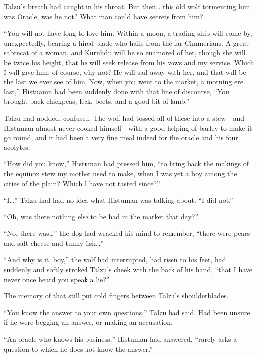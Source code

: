 Talzu's breath had caught in his throat. But then\ldots{} this old wolf tormenting him was Oracle, was he not? What man could have secrets from him?

``You will not have long to love him. Within a moon, a trading ship will come by, unexpectedly, bearing a hired blade who hails from the far Cimmerians. A great sabrecat of a woman, and Kuruhdu will be so enamored of her, though she will be twice his height, that he will seek release from his vows and my service. Which I will give him, of course, why not? He will sail away with her, and that will be the last we ever see of him. Now, when you went to the market, a morning ere last,'' Histuamn had been suddenly done with that line of discourse, ``You brought back chickpeas, leek, beets, and a good bit of lamb.''

Talzu had nodded, confused. The wolf had tossed all of these into a stew---and Histuman almost never cooked himself---with a good helping of barley to make it go round, and it had been a very fine meal indeed for the oracle and his four acolytes.

``How did you know,'' Histuman had pressed him, ``to bring back the makings of the equinox stew my mother used to make, when I was yet a boy among the cities of the plain? Which I have not tasted since?''

``I\ldots'' Talzu had had no idea what Histuman was talking about. ``I did not.''

``Oh, was there nothing else to be had in the market that day?''

``No, there was\ldots'' the dog had wracked his mind to remember, ``there were pears and salt cheese and tunny fish\ldots''

``And why is it, boy,'' the wolf had interrupted, had risen to his feet, had suddenly and softly stroked Talzu's cheek with the back of his hand, ``that I have never once heard you speak a lie?''

The memory of that still put cold fingers between Talzu's shoulderblades.

``You know the answer to your own questions,'' Talzu had said. Had been unsure if he were begging an answer, or making an accusation.

``An oracle who knows his business,'' Histuman had answered, ``rarely asks a question to which he does not know the answer.''

\secdiv

